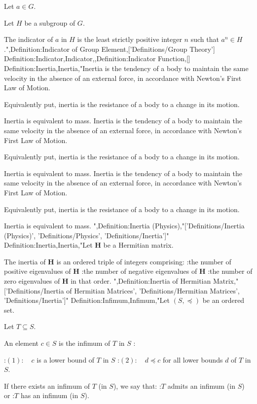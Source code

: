 Let $a \in G$.

Let $H$ be a subgroup of $G$.


The indicator of $a$ in $H$ is the least strictly positive integer $n$ such that $a^n \in H$.",Definition:Indicator of Group Element,['Definitions/Group Theory']
Definition:Indicator,Indicator,,Definition:Indicator Function,[]
Definition:Inertia,Inertia,"Inertia is the tendency of a body to maintain the same velocity in the absence of an external force, in accordance with Newton's First Law of Motion.

Equivalently put, inertia is the resistance of a body to a change in its motion.

Inertia is equivalent to mass.
Inertia is the tendency of a body to maintain the same velocity in the absence of an external force, in accordance with Newton's First Law of Motion.

Equivalently put, inertia is the resistance of a body to a change in its motion.

Inertia is equivalent to mass.
Inertia is the tendency of a body to maintain the same velocity in the absence of an external force, in accordance with Newton's First Law of Motion.

Equivalently put, inertia is the resistance of a body to a change in its motion.

Inertia is equivalent to mass.
",Definition:Inertia (Physics),"['Definitions/Inertia (Physics)', 'Definitions/Physics', 'Definitions/Inertia']"
Definition:Inertia,Inertia,"Let $\mathbf H$ be a Hermitian matrix.

The inertia of $\mathbf H$ is an ordered triple of integers comprising:
:the number of positive eigenvalues of $\mathbf H$
:the number of negative eigenvalues of $\mathbf H$
:the number of zero eigenvalues of $\mathbf H$
in that order.
",Definition:Inertia of Hermitian Matrix,"['Definitions/Inertia of Hermitian Matrices', 'Definitions/Hermitian Matrices', 'Definitions/Inertia']"
Definition:Infimum,Infimum,"Let $\left( S, \preccurlyeq \right)$ be an ordered set.

Let $T \subseteq S$.


An element $c \in S$ is the infimum of $T$ in $S$ :

:$(1): \quad c$ is a lower bound of $T$ in $S$
:$(2): \quad d \preccurlyeq c$ for all lower bounds $d$ of $T$ in $S$.


If there exists an infimum of $T$ (in $S$), we say that:
:$T$ admits an infimum (in $S$) or
:$T$ has an infimum (in $S$).


